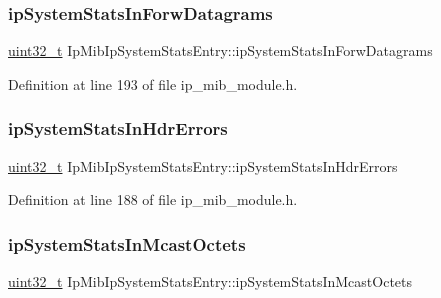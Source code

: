 \subsubsection{\texorpdfstring{ip\+System\+Stats\+In\+Forw\+Datagrams}{ipSystemStatsInForwDatagrams}}
{\footnotesize\ttfamily \hyperlink{stdint_8h_a435d1572bf3f880d55459d9805097f62}{uint32\+\_\+t} Ip\+Mib\+Ip\+System\+Stats\+Entry\+::ip\+System\+Stats\+In\+Forw\+Datagrams}



Definition at line 193 of file ip\+\_\+mib\+\_\+module.\+h.

\mbox{\label{structIpMibIpSystemStatsEntry_afc358802808e5596ca9a8fb16a9e6fdd}} 
\subsubsection{\texorpdfstring{ip\+System\+Stats\+In\+Hdr\+Errors}{ipSystemStatsInHdrErrors}}
{\footnotesize\ttfamily \hyperlink{stdint_8h_a435d1572bf3f880d55459d9805097f62}{uint32\+\_\+t} Ip\+Mib\+Ip\+System\+Stats\+Entry\+::ip\+System\+Stats\+In\+Hdr\+Errors}



Definition at line 188 of file ip\+\_\+mib\+\_\+module.\+h.

\mbox{\label{structIpMibIpSystemStatsEntry_aaed5f6ccc869b03c4c193c174fb41ac7}} 
\subsubsection{\texorpdfstring{ip\+System\+Stats\+In\+Mcast\+Octets}{ipSystemStatsInMcastOctets}}
{\footnotesize\ttfamily \hyperlink{stdint_8h_a435d1572bf3f880d55459d9805097f62}{uint32\+\_\+t} Ip\+Mib\+Ip\+System\+Stats\+Entry\+::ip\+System\+Stats\+In\+Mcast\+Octets}



